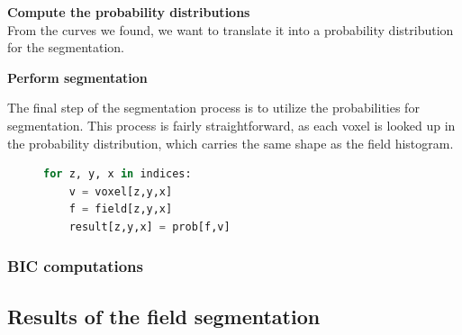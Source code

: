 \vspace{\baselineskip}
\noindent\textbf{Compute the probability distributions} \\

From the curves we found, we want to translate it into a probability distribution for the segmentation.

\vspace{\baselineskip}
\noindent\textbf{Perform segmentation}

The final step of the segmentation process is to utilize the probabilities for segmentation.
This process is fairly straightforward, as each voxel is looked up in the probability distribution, which carries the same shape as the field histogram.

\begin{figure}
    \begin{lstlisting}[language=Python,caption=Python-like pseudo code for the final segmentation.,label=lis:segmentation]
for z, y, x in indices:
    v = voxel[z,y,x]
    f = field[z,y,x]
    result[z,y,x] = prob[f,v]
    \end{lstlisting}
\end{figure}

\subsubsection{BIC computations}


\subsection{Results of the field segmentation}

